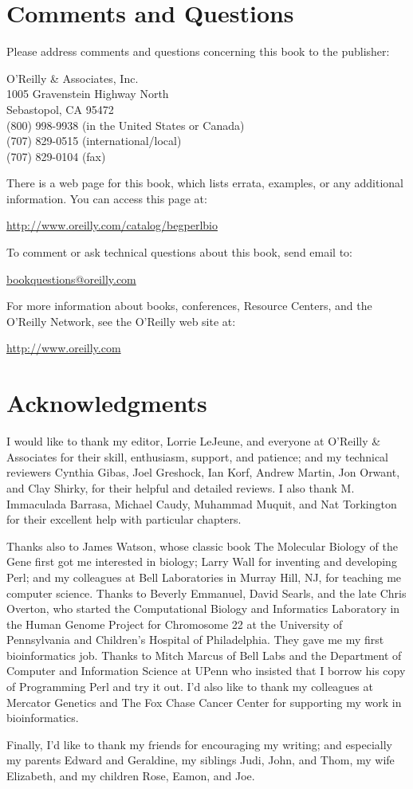 \section*{Comments and Questions}
Please address comments and questions concerning this book to the publisher:

O'Reilly \& Associates, Inc.\\
1005 Gravenstein Highway North\\
Sebastopol, CA 95472\\
(800) 998-9938 (in the United States or Canada)\\
(707) 829-0515 (international/local)\\
(707) 829-0104 (fax)

There is a web page for this book, which lists errata, examples, or any additional information. You can access this page at:

\href{http://www.oreilly.com/catalog/begperlbio}{http://www.oreilly.com/catalog/begperlbio}

To comment or ask technical questions about this book, send email to:

\href{bookquestions@oreilly.com}{bookquestions@oreilly.com}

For more information about books, conferences, Resource Centers, and the O'Reilly Network, see the O'Reilly web site at:

\href{http://www.oreilly.com}{http://www.oreilly.com}

\section*{Acknowledgments}
I would like to thank my editor, Lorrie LeJeune, and everyone at O'Reilly \& Associates for their skill, enthusiasm, support, and patience; and my technical reviewers Cynthia Gibas, Joel Greshock, Ian Korf, Andrew Martin, Jon Orwant, and Clay Shirky, for their helpful and detailed reviews. I also thank M. Immaculada Barrasa, Michael Caudy, Muhammad Muquit, and Nat Torkington for their excellent help with particular chapters.

Thanks also to James Watson, whose classic book The Molecular Biology of the Gene first got me interested in biology; Larry Wall for inventing and developing Perl; and my colleagues at Bell Laboratories in Murray Hill, NJ, for teaching me computer science. Thanks to Beverly Emmanuel, David Searls, and the late Chris Overton, who started the Computational Biology and Informatics Laboratory in the Human Genome Project for Chromosome 22 at the University of Pennsylvania and Children's Hospital of Philadelphia. They gave me my first bioinformatics job. Thanks to Mitch Marcus of Bell Labs and the Department of Computer and Information Science at UPenn who insisted that I borrow his copy of Programming Perl and try it out. I'd also like to thank my colleagues at Mercator Genetics and The Fox Chase Cancer Center for supporting my work in bioinformatics.

Finally, I'd like to thank my friends for encouraging my writing; and especially my parents Edward and Geraldine, my siblings Judi, John, and Thom, my wife Elizabeth, and my children Rose, Eamon, and Joe. 
